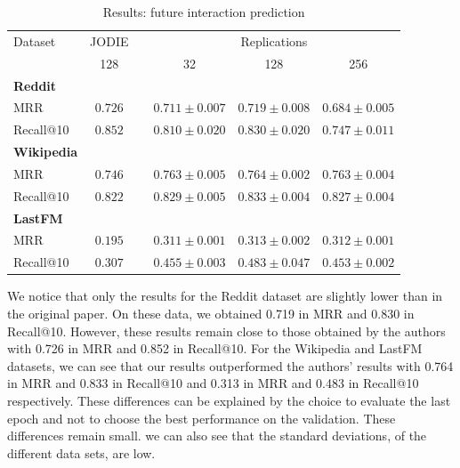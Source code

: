 \begin{table}[H]
    \centering
    \begin{tabular}{@{}lccccc@{}}
    \toprule
    Dataset\hspace*{3em} & JODIE & \phantom{abc} & \multicolumn{3}{c}{Replications} \\
    \cmidrule{2-2} \cmidrule{4-6}
    & 128 && \multicolumn{1}{c}{32} & \multicolumn{1}{c}{128} & \multicolumn{1}{c}{256} \\
    \midrule
    \multicolumn{1}{l}{\hspace{-0.2cm}\textbf{Reddit}} \\
    {\quad \small MRR} & $\boldsymbol{0.726}$  && $0.711 \pm 0.007$ & $0.719 \pm 0.008$ & $0.684 \pm 0.005$ \\
    {\quad\small Recall@10}  &$\boldsymbol{0.852}$ && $0.810 \pm 0.020$ & $0.830 \pm 0.020$ & $0.747 \pm 0.011$\\
    \multicolumn{1}{l}{\hspace{-0.2cm}\textbf{Wikipedia}}\\
    {\quad\small MRR} &$\boldsymbol{0.746}$ && $0.763 \pm 0.005$ & $0.764 \pm 0.002$ & $0.763 \pm 0.004$  \\
    {\quad\small Recall@10}  & $\boldsymbol{0.822}$ && $0.829 \pm 0.005$ & $0.833 \pm 0.004$ & $0.827 \pm 0.004$\\
    \multicolumn{1}{l}{\hspace{-0.2cm}\textbf{LastFM}} \\
    {\quad\small MRR} &$\boldsymbol{0.195}$ && $0.311 \pm 0.001$ & $0.313 \pm 0.002$ & $0.312 \pm 0.001$ \\
    {\quad\small Recall@10}  & $\boldsymbol{0.307}$ && $0.455 \pm 0.003$ & $0.483 \pm 0.047$ & $0.453 \pm 0.002$\\
    \bottomrule
    \end{tabular}
    \caption{Results: future interaction prediction}
\end{table}

We notice that only the results for the Reddit dataset are slightly lower than in the original paper. On these data, we obtained 0.719 in MRR and 0.830 in Recall@10. However, these results remain close to those obtained by the authors with 0.726 in MRR and 0.852 in Recall@10. For the Wikipedia and LastFM datasets, we can see that our results outperformed the authors' results with 0.764 in MRR and 0.833 in Recall@10 and 0.313 in MRR and 0.483 in Recall@10 respectively. These differences can be explained by the choice to evaluate the last epoch and not to choose the best performance on the validation. These differences remain small. we can also see that the standard deviations, of the different data sets, are low.\\

